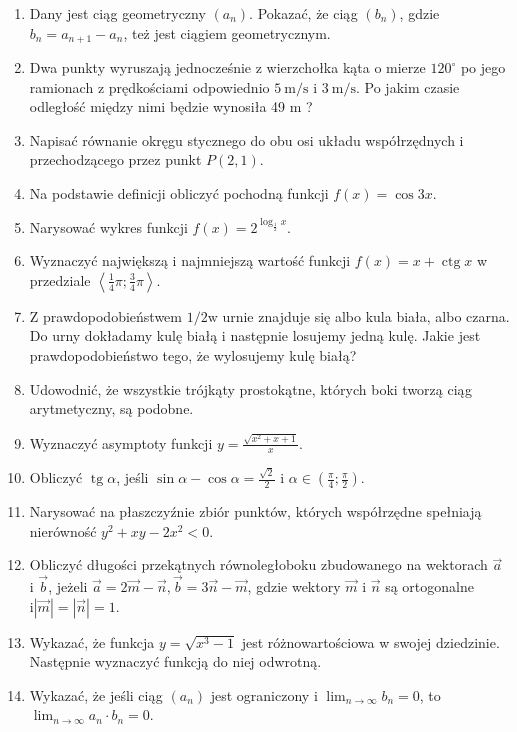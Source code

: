 \documentclass[10pt]{article}
\begin{document}
\begin{enumerate}
  \item Dany jest ciąg geometryczny \(\left(a_{n}\right)\). Pokazać, że ciąg \(\left(b_{n}\right)\), gdzie \(b_{n}=a_{n+1}-a_{n}\), też jest ciągiem geometrycznym.
  \item Dwa punkty wyruszają jednocześnie z wierzchołka kąta o mierze \(120^{\circ}\) po jego ramionach z prędkościami odpowiednio \(5 \mathrm{~m} / \mathrm{s}\) i \(3 \mathrm{~m} / \mathrm{s}\). Po jakim czasie odległość między nimi będzie wynosiła 49 m ?
  \item Napisać równanie okręgu stycznego do obu osi układu współrzędnych i przechodzącego przez punkt \(P(2,1)\).
  \item Na podstawie definicji obliczyć pochodną funkcji \(f(x)=\cos 3 x\).
  \item Narysować wykres funkcji \(f(x)=2^{\log _{\frac{1}{2}} x}\).
  \item Wyznaczyć największą i najmniejszą wartość funkcji \(f(x)=x+\operatorname{ctg} x\) w przedziale \(\left\langle\frac{1}{4} \pi ; \frac{3}{4} \pi\right\rangle\).
  \item Z prawdopodobieństwem \(1 / 2 \mathrm{w}\) urnie znajduje się albo kula biała, albo czarna. Do urny dokładamy kulę białą i następnie losujemy jedną kulę. Jakie jest prawdopodobieństwo tego, że wylosujemy kulę białą?
  \item Udowodnić, że wszystkie trójkąty prostokątne, których boki tworzą ciąg arytmetyczny, są podobne.
  \item Wyznaczyć asymptoty funkcji \(y=\frac{\sqrt{x^{2}+x+1}}{x}\).
  \item Obliczyć \(\operatorname{tg} \alpha\), jeśli \(\sin \alpha-\cos \alpha=\frac{\sqrt{2}}{2}\) i \(\alpha \in\left(\frac{\pi}{4} ; \frac{\pi}{2}\right)\).
  \item Narysować na płaszczyźnie zbiór punktów, których współrzędne spełniają nierówność \(y^{2}+x y-2 x^{2}<0\).
  \item Obliczyć długości przekątnych równoległoboku zbudowanego na wektorach \(\vec{a}\) i \(\vec{b}\), jeżeli \(\vec{a}=2 \vec{m}-\vec{n}, \vec{b}=3 \vec{n}-\vec{m}\), gdzie wektory \(\vec{m}\) i \(\vec{n}\) są ortogonalne \(\mathrm{i}|\vec{m}|=|\vec{n}|=1\).
  \item Wykazać, że funkcja \(y=\sqrt{x^{3}-1}\) jest różnowartościowa w swojej dziedzinie. Następnie wyznaczyć funkcją do niej odwrotną.
  \item Wykazać, że jeśli ciąg \(\left(a_{n}\right)\) jest ograniczony i \(\lim _{n \rightarrow \infty} b_{n}=0\), to \(\lim _{n \rightarrow \infty} a_{n} \cdot b_{n}=0\).
\end{enumerate}
\end{document}
